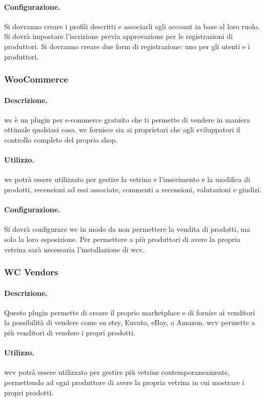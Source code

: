 \paragraph{Configurazione.}  Si dovranno creare i profili descritti e associarli agli account in base al loro ruolo. Si dovrà impostare l'iscrizione previa approvazione per le registrazioni di produttori. Si dovranno creare due form di registrazione: uno per gli utenti e i produttori.

\subsubsection{WooCommerce} \label{plugin:wc}
\paragraph{Descrizione.} \gls{wc} è un plugin per e-commerce gratuito che ti permette di vendere in maniera ottimale qualsiasi cosa. \gls{wc} fornisce sia ai proprietari che agli sviluppatori il controllo completo del proprio shop.
\paragraph{Utilizzo.} \gls{wc} potrà essere utilizzato per gestire la vetrina e l'inserimento e la modifica di prodotti, recensioni ad essi associate, commenti a recensioni, valutazioni e giudizi.
\paragraph{Configurazione.} Si dovrà configurare \gls{wc} in modo da non permettere la vendita di prodotti, ma solo la loro esposizione.
Per permettere a più produttori di avere la propria vetrina sarà necessaria l'installazione di \gls{wcv}.

\subsubsection{WC Vendors} \label{plugin:wcv}
\paragraph{Descrizione.} Questo plugin permette di creare il proprio marketplace e di fornire ai venditori la possibilità di vendere come su etsy, Envato, eBay, o Amazon. \gls{wcv} permette a più venditori di vendere i propri prodotti.
\paragraph{Utilizzo.} \gls{wcv} potrà essere utilizzato per gestire più vetrine contemporaneamente, permettendo ad ogni produttore di avere la propria vetrina in cui mostrare i propri prodotti.

